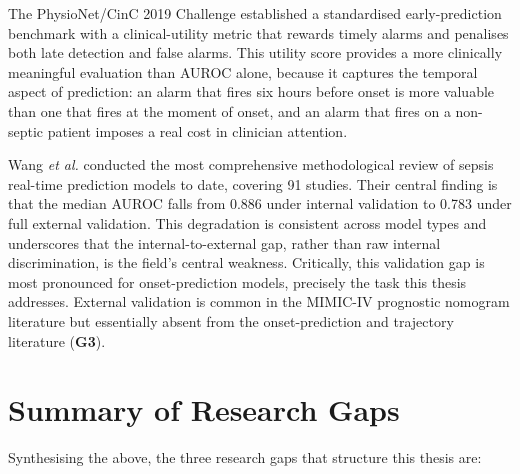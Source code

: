 The PhysioNet/CinC 2019 Challenge \cite{reyna2020physionet} established a
standardised early-prediction benchmark with a clinical-utility metric that
rewards timely alarms and penalises both late detection and false alarms. This
utility score provides a more clinically meaningful evaluation than AUROC alone,
because it captures the temporal aspect of prediction: an alarm that fires six
hours before onset is more valuable than one that fires at the moment of onset,
and an alarm that fires on a non-septic patient imposes a real cost in
clinician attention.

Wang \emph{et al.} \cite{wang2025srpm} conducted the most comprehensive
methodological review of sepsis real-time prediction models to date, covering
91 studies. Their central finding is that the median AUROC falls from 0.886
under internal validation to 0.783 under full external validation. This
degradation is consistent across model types and underscores that the
internal-to-external gap, rather than raw internal discrimination, is the
field's central weakness. Critically, this validation gap is most pronounced
for onset-prediction models, precisely the task this thesis addresses.
External validation is common in the MIMIC-IV prognostic nomogram literature
but essentially absent from the onset-prediction and trajectory literature
(\textbf{G3}).

\section{Summary of Research Gaps}
\label{sec:gap_summary}

Synthesising the above, the three research gaps that structure this thesis are:

